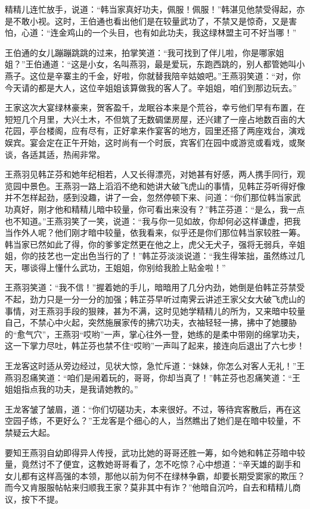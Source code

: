 \documentclass[12pt,oneside]{book}
\begin{document}
精精儿连忙放手，说道：``韩当家真好功夫，佩服！佩服！''韩湛见他禁受得起，亦是不敢小视。这时，王伯通也看出他们是在较量武功了，不禁又是惊奇，又是害怕，心道：``连金鸡山的一个头目，也有如此功夫，我这绿林盟主可不好当哪！''

王伯通的女儿蹦蹦跳跳的过来，拍掌笑道：``我可找到了伴儿啦，你是哪家姐姐？''王伯通道：``这是小女，名叫燕羽，最是爱玩，东跑西跳的，别人都管她叫小燕子。这位是辛寨主的千金，好啦，你就替我陪辛姑娘吧。''王燕羽笑道：``对，你今天请的都是大人，这位辛姐姐该算做我的客人了。辛姐姐，咱们到那边玩去。''

王家这次大宴绿林豪来，贺客盈千，龙眠谷本来是个荒谷，幸亏他们早有布置，在短短几个月里，大兴土木，不但筑了无数碉堡房屋，还兴建了一座占地数百亩的大花园，亭台楼阁，应有尽有，正好拿来作宴客的地方，园里还搭了两座戏台，演戏娱宾。宴会定在正午开始，这时尚有一个时辰，宾客们在园中或游览或看戏，或聚谈，各适其适，热闹非常。

王燕羽见韩芷芬和她年纪相若，人又长得漂亮，对她甚有好感，两人携手同行，观览园中景色。王燕羽一路上滔滔不绝和她讲大破飞虎山的事情，见韩芷芬听得好像并不怎样起劲，感到没趣，讲了一会，忽然停顿下来、问道：``你们那位韩当家武功真好，刚才他和精精儿暗中较量，你可看出来没有？''韩芷芬道：``是么，我一点也不知道。''王燕羽笑了一笑，说道：``我与你一见如故，你却何必这样谦虚，把我当作外人呢？他们刚才暗中较量，依我看来，似乎还是你们那位韩当家较胜一筹。韩当家已然如此了得，你的爹爹定然更在他之上，虎父无犬子，强将无弱兵，辛姐姐，你的技艺也一定出色当行的了！''韩芷芬淡淡说道：``我生得笨拙，虽然练过几天，哪谈得上懂什么武功，王姐姐，你别给我脸上贴金啦！''

王燕羽笑道：``我不信！''握着她的手儿，暗暗用了几分内劲，她倒是伯韩芷芬禁受不起，劲力只是一分一分的加强；韩芷芬早听过南霁云讲述王家父女大破飞虎山的事情，对王燕羽手段的狠辣，甚为不满，这时见她学精精儿的所为，又来暗中较量自己，不禁心中火起，突然施展家传的拂穴功夫，衣袖轻轻一拂，拂中了她腰胁的``愈气穴''，王燕羽``哎哟''一声，掌心往外一登，她练的是柔中带刚的绵掌功夫，这一下掌力尽吐，韩芷芬也禁不住``哎哟''一声叫了起来，接连向后退出了六七步！

王龙客这时适从旁边经过，见状大惊，急忙斥道：``妹妹，你怎么对客人无礼！''王燕羽忍痛笑道：``咱们是闹着玩的，哥哥，你却当真了！''韩芷芬也忍痛笑道：``王姐姐指点我的功夫，是我请她教的。''

王龙客皱了皱眉，道：``你们切磋功夫，本来很好。不过，等待宾客散后，再在这空园子练，不更好么？''王龙客是个细心的人，当然瞧出了她们是在暗中较量，不禁疑云大起。

要知王燕羽自幼即得异人传授，武功比她的哥哥还胜一筹，如今她和韩芷芬暗中较量，竟然讨不了便宜，这教她哥哥看了，怎不吃惊？心中想道：``辛天雄的副手和女儿都有这样高强的本领，那他以前为何不在绿林争霸，却要长期受窦家的欺压？而今又肯服服帖帖来归顺我王家？莫非其中有诈？''他暗自沉吟，自去和精精儿商议，按下不提。
\end{document}
